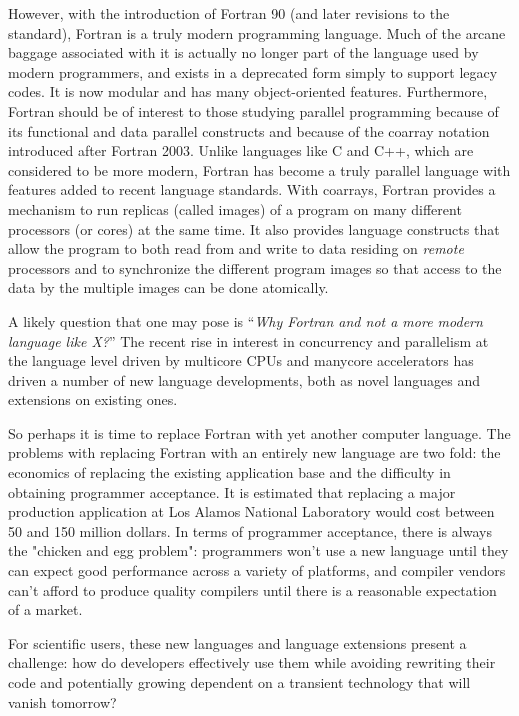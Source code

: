 \documentclass[10pt, conference, compsocconf]{IEEEtran}
\begin{document}
However, with the introduction of Fortran 90 (and later revisions to the
standard), Fortran is a truly modern programming language. Much of the arcane
baggage associated with it is actually no longer part of the language used by
modern programmers, and exists in a deprecated form simply to support legacy
codes. It is now modular and has many object-oriented features. Furthermore,
Fortran should be of interest to those studying parallel programming because
of its functional and data parallel constructs and because of the coarray
notation introduced after Fortran 2003. Unlike languages like C and C++, which
are considered to be more modern, Fortran has become a truly parallel language
with features added to recent language standards. With coarrays, Fortran
provides a mechanism to run replicas (called images) of a program on many
different processors (or cores) at the same time. It also provides language
constructs that allow the program to both read from and write to data residing
on {\it remote} processors and to synchronize the different program images so
that access to the data by the multiple images can be done atomically.

A likely question that one may pose is ``\emph{Why Fortran and not a more
  modern language like X?}''  The recent rise in interest in concurrency and
parallelism at the language level driven by multicore CPUs and manycore
accelerators has driven a number of new language developments, both as novel
languages and extensions on existing ones.

So perhaps it is time to replace Fortran with yet another computer language.  The
problems with replacing Fortran with an entirely new language are two fold:
the economics of replacing the existing application base and the difficulty in
obtaining programmer acceptance.  It is estimated that replacing a major
production application at Los Alamos National Laboratory would cost between 50
and 150 million dollars.  In terms of programmer acceptance, there is always
the "chicken and egg problem": programmers won't use a new language until they
can expect good performance across a variety of platforms, and compiler
vendors can't afford to produce quality compilers until there is a reasonable
expectation of a market.

For scientific users, these new languages and language extensions
present a challenge: how do developers effectively use them while
avoiding rewriting their code and potentially growing dependent on a
transient technology that will vanish tomorrow?
\end{document}
